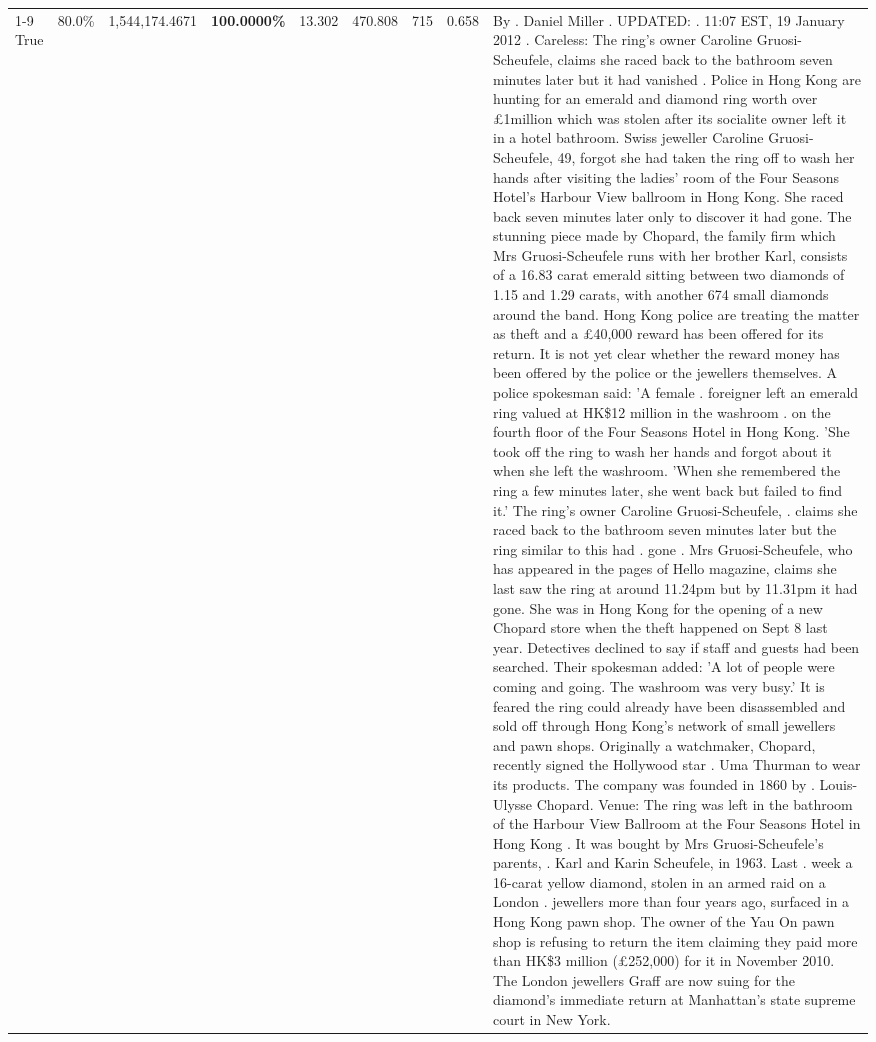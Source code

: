 \begin{table}[H]
\begin{tabular}{lllrlllll}
\cline{1-9}
True & 80.0\% & 1,544,174.4671 & \bfseries \color{red} 100.0000\% & 13.302 & 470.808 & 715 & 0.658 & By . Daniel Miller . UPDATED: . 11:07 EST, 19 January 2012 . Careless: The ring's owner Caroline Gruosi-Scheufele, claims she raced back to the bathroom seven minutes later but it had vanished . Police in Hong Kong are hunting for an emerald and diamond ring worth over £1million which was stolen after its socialite owner left it in a hotel bathroom. Swiss jeweller Caroline Gruosi-Scheufele, 49, forgot she had taken the ring off to wash her hands after visiting the ladies' room of the Four Seasons Hotel's Harbour View ballroom in Hong Kong. She raced back seven minutes later only to discover it had gone. The stunning piece made by Chopard, the family firm which Mrs Gruosi-Scheufele runs with her brother Karl, consists of a 16.83 carat emerald sitting between two diamonds of 1.15 and 1.29 carats, with another 674 small diamonds around the band. Hong Kong police are treating the matter as theft and a £40,000 reward has been offered for its return. It is not yet clear whether the reward money has been offered by the police or the jewellers themselves. A police spokesman said: 'A female . foreigner left an emerald ring valued at HK\$12 million in the washroom . on the fourth floor of the Four Seasons Hotel in Hong Kong. 'She took off the ring to wash her hands and forgot about it when she left the washroom. 'When she remembered the ring a few minutes later, she went back but failed to find it.' The ring's owner Caroline Gruosi-Scheufele, . claims she raced back to the bathroom seven minutes later but the ring similar to this had . gone . Mrs Gruosi-Scheufele, who has appeared in the pages of Hello magazine, claims she last saw the ring at around 11.24pm but by 11.31pm it had gone. She was in Hong Kong for the opening of a new Chopard store when the theft happened on Sept 8 last year. Detectives declined to say if staff and guests had been searched. Their spokesman added: 'A lot of people were coming and going. The washroom was very busy.' It is feared the ring could already have been disassembled and sold off through Hong Kong's network of small jewellers and pawn shops. Originally a watchmaker, Chopard, recently signed the Hollywood star . Uma Thurman to wear its products. The company was founded in 1860 by . Louis-Ulysse Chopard. Venue: The ring was left in the bathroom of the Harbour View Ballroom at the Four Seasons Hotel in Hong Kong . It was bought by Mrs Gruosi-Scheufele's  parents, . Karl and Karin Scheufele, in 1963. Last . week a 16-carat yellow diamond, stolen in an armed raid on a London . jewellers more than four years ago, surfaced in a Hong Kong pawn shop. The owner of the Yau On pawn shop is refusing to return the item claiming they paid more than HK\$3 million (£252,000) for it in November 2010. The London jewellers Graff are now suing for the diamond’s immediate return at Manhattan’s state supreme court in New York. \\

\end{tabular}
\end{table}
